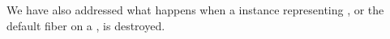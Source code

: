 We have also addressed what happens when a \fiber instance representing \main,
or the default fiber on a \thread, is destroyed.

